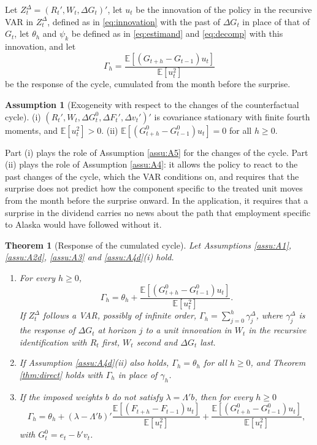 \documentclass[12pt,a4paper]{article}
\newtheorem{thm}{Theorem}
\theoremstyle{definition}
\newtheorem{assumption}{Assumption}
\theoremstyle{definition}\newtheorem{example}{Example}
\theoremstyle{definition}\newtheorem{definition}{Definition}
\newcommand{\E}{\mathbb{E}}
\begin{document}
Let $Z^\Delta_t=(R_t',W_t,\Delta G_t)'$, let $u_t$ be the innovation of the policy in the recursive VAR in $Z^\Delta_t$, defined as in \eqref{eq:innovation} with the past of $\Delta G_t$ in place of that of $G_t$, let $\theta_h$ and $\psi_k$ be defined as in \eqref{eq:estimand} and \eqref{eq:decomp} with this innovation, and let
\begin{equation}
\Gamma_h=\frac{\E[(G_{t+h}-G_{t-1})u_t]}{\E[u_t^2]}
\label{eq:cumcycle}
\end{equation}
be the response of the cycle, cumulated from the month before the surprise.

\begin{assumption}[Exogeneity with respect to the changes of the counterfactual cycle\label{assu:A4d}]
(i) $(R_t',W_t,\Delta G^0_t,\Delta F_t',\Delta v_t')'$ is covariance stationary with finite fourth moments, and $\E[u_t^2]>0$. (ii) $\E[(G^0_{t+h}-G^0_{t-1})u_t]=0$ for all $h\geq0$.
\end{assumption}

Part (i) plays the role of Assumption \ref{assu:A5} for the changes of the cycle. Part (ii) plays the role of Assumption \ref{assu:A4}: it allows the policy to react to the past changes of the cycle, which the VAR conditions on, and requires that the surprise does not predict how the component specific to the treated unit moves from the month before the surprise onward. In the application, it requires that a surprise in the dividend carries no news about the path that employment specific to Alaska would have followed without it.

\begin{thm}[Response of the cumulated cycle\label{thm:diff}]
Let Assumptions \ref{assu:A1}, \ref{assu:A2d}, \ref{assu:A3} and \ref{assu:A4d}(i) hold.
\begin{enumerate}
\item[(a)] For every $h\geq0$,
\begin{equation*}
\Gamma_h=\theta_h+\frac{\E[(G^0_{t+h}-G^0_{t-1})u_t]}{\E[u_t^2]}.
\end{equation*}
If $Z^\Delta_t$ follows a VAR, possibly of infinite order, $\Gamma_h=\sum_{j=0}^{h}\gamma^\Delta_j$, where $\gamma^\Delta_j$ is the response of $\Delta G_t$ at horizon $j$ to a unit innovation in $W_t$ in the recursive identification with $R_t$ first, $W_t$ second and $\Delta G_t$ last.
\item[(b)] If Assumption \ref{assu:A4d}(ii) also holds, $\Gamma_h=\theta_h$ for all $h\geq0$, and Theorem \ref{thm:direct} holds with $\Gamma_h$ in place of $\gamma_h$.
\item[(c)] If the imposed weights $b$ do not satisfy $\lambda=\Lambda'b$, then for every $h\geq0$
\begin{equation*}
\Gamma_h=\theta_h+(\lambda-\Lambda'b)'\frac{\E[(F_{t+h}-F_{t-1})u_t]}{\E[u_t^2]}+\frac{\E[(G^0_{t+h}-G^0_{t-1})u_t]}{\E[u_t^2]},
\end{equation*}
with $G^0_t=e_t-b'v_t$.
\end{enumerate}
\end{thm}
\end{document}
